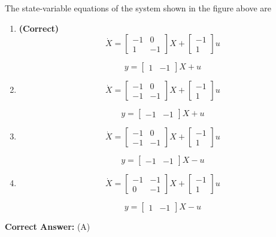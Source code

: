 \documentclass[11pt,a4paper]{article}
\begin{document}
The state-variable equations of the system shown in the figure above are


\begin{enumerate}[label=(\Alph*)]
    \item \textbf{(Correct)} \[
\dot{X}= \begin{bmatrix} -1 &0 \\ 1 & -1 \end{bmatrix}X+\begin{bmatrix} -1\\ 1 \end{bmatrix}u
\]

\[
y=\begin{bmatrix} 1 & -1 \end{bmatrix}X+u
\]
    \item \[
\dot{X}= \begin{bmatrix} -1 &0 \\ -1 & -1 \end{bmatrix}X+\begin{bmatrix} -1\\ 1 \end{bmatrix}u
\]
 
\[
y=\begin{bmatrix} -1 & -1 \end{bmatrix}X+u
\]
    \item \[
\dot{X}= \begin{bmatrix} -1 &0 \\ -1 & -1 \end{bmatrix}X+\begin{bmatrix} -1\\ 1 \end{bmatrix}u
\]
 
\[
y=\begin{bmatrix} -1 & -1 \end{bmatrix}X-u
\]
    \item \[
\dot{X}= \begin{bmatrix} -1 &-1 \\ 0 & -1 \end{bmatrix}X+\begin{bmatrix} -1\\ 1 \end{bmatrix}u
\]
 
\[
y=\begin{bmatrix} 1 & -1 \end{bmatrix}X-u
\]
\end{enumerate}

\noindent \textbf{Correct Answer:} (A)
\end{document}
